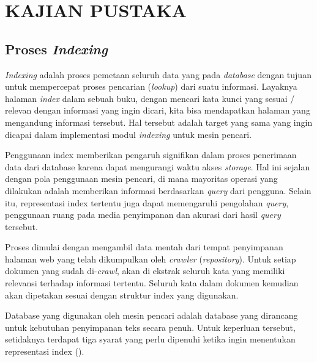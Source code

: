 
\chapter{KAJIAN PUSTAKA}

\section{Proses \emph{Indexing}}

\emph{Indexing} adalah proses pemetaan seluruh data yang pada \emph{database} 
dengan tujuan untuk mempercepat proses pencarian (\textit{lookup}) dari suatu 
informasi. Layaknya halaman \textit{index} dalam sebuah buku, dengan mencari 
kata kunci yang sesuai / relevan dengan informasi yang ingin dicari, kita bisa
mendapatkan halaman yang mengandung informasi tersebut. Hal tersebut adalah
target yang sama yang ingin dicapai dalam implementasi modul \textit{indexing} 
untuk mesin pencari.

Penggunaan index memberikan pengaruh signifikan dalam proses penerimaan data
dari database karena dapat mengurangi waktu akses \emph{storage}. Hal ini
sejalan dengan pola penggunaan mesin pencari, di mana mayoritas operasi yang
dilakukan adalah memberikan informasi berdasarkan \emph{query} dari pengguna.
Selain itu, representasi index tertentu juga dapat memengaruhi pengolahan
\emph{query}, penggunaan ruang pada media penyimpanan dan akurasi dari hasil
\emph{query} tersebut.

Proses dimulai dengan mengambil data mentah dari tempat penyimpanan halaman web
yang telah dikumpulkan oleh \emph{crawler} (\textit{repository}). Untuk setiap 
dokumen yang sudah di-\textit{crawl}, akan di ekstrak seluruh kata yang memiliki 
relevansi terhadap informasi tertentu. Seluruh kata dalam dokumen kemudian akan
dipetakan sesuai dengan struktur index yang digunakan.

Database yang digunakan oleh mesin pencari adalah database yang dirancang
untuk kebutuhan penyimpanan teks secara penuh. Untuk keperluan tersebut,
setidaknya terdapat tiga syarat yang perlu dipenuhi ketika ingin menentukan
representasi index (\cite{zobel1992efficient}).


